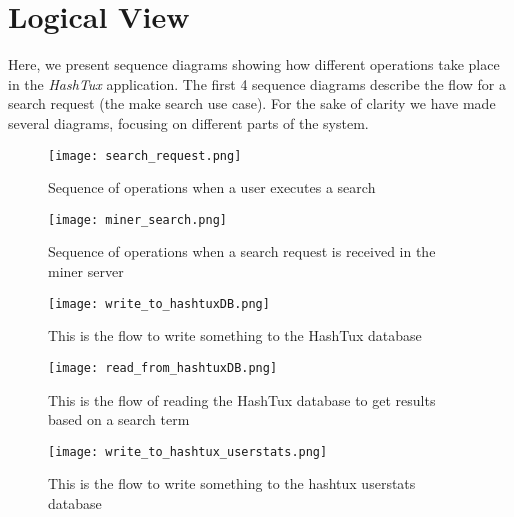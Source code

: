 \hypertarget{logicalview}{
\chapter{Logical View}}
Here, we present sequence diagrams showing how different operations take place
in the \textit{HashTux} application. \newline
The first 4 sequence diagrams describe the flow for a search request (the make
search use case). For the sake of clarity we have made several diagrams,
focusing on different parts of the system.
\newpage
\begin{figure}[ht]
  \centering
  \texttt{[image: search\_request.png]}
  \caption{Sequence of operations when a user executes a search}
\end{figure}
\newpage
\begin{figure}[ht]
  \centering
  \texttt{[image: miner\_search.png]}
  \caption{Sequence of operations when a search request is received in the miner
     server}
\end{figure}
\newpage
\begin{figure}[ht]
  \centering
  \texttt{[image: write\_to\_hashtuxDB.png]}
  \caption{This is the flow to write something to the HashTux database}
\end{figure}
\begin{figure}[ht]
  \centering
  \texttt{[image: read\_from\_hashtuxDB.png]}
  \caption{This is the flow of reading the HashTux database to get results based
     on a search term}
\end{figure}
\begin{figure}[ht]
  \centering
  \texttt{[image: write\_to\_hashtux\_userstats.png]}
  \caption{This is the flow to write something to the hashtux\textunderscore
     userstats database}
\end{figure}